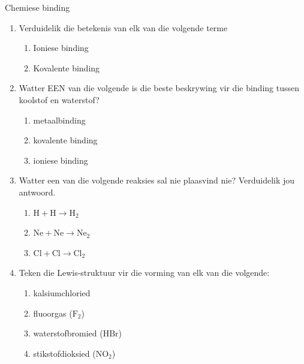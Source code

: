            \begin{eocexercises}{Chemiese binding}
            \nopagebreak
      \label{m38689*id147820}\begin{enumerate}[noitemsep, label=\textbf{\arabic*}. ] 
            \label{m38689*uid158}\item Verduidelik die betekenis van elk van die volgende terme
\label{m38689*id147842}\begin{enumerate}[noitemsep, label=\textbf{\alph*}. ] 
            \label{m38689*uid159}\item Ioniese binding
\label{m38689*uid160}\item Kovalente binding
\end{enumerate}
                \label{m38689*uid162}\item Watter EEN van die volgende is die beste beskrywing vir die binding tussen koolstof en waterstof?
\label{m38689*id147923}\begin{enumerate}[noitemsep, label=\textbf{\alph*}. ] 
            \label{m38689*uid163}\item metaalbinding
\label{m38689*uid164}\item kovalente binding
\label{m38689*uid165}\item ioniese binding
\end{enumerate}
                \label{m38689*uid171}\item Watter een van die volgende reaksies sal nie plaasvind nie? Verduidelik jou antwoord.
\label{m38689*id148047}\begin{enumerate}[noitemsep, label=\textbf{\alph*}. ] 
            \label{m38689*uid172}\item $\mathrm{H}+\mathrm{H}\to {\mathrm{H}}_{2}$\label{m38689*uid173}\item $\mathrm{Ne}+\mathrm{Ne}\to {\mathrm{Ne}}_{2}$\label{m38689*uid174}\item $\mathrm{Cl}+\mathrm{Cl}\to {\mathrm{Cl}}_{2}$\end{enumerate}
                \label{m38689*uid175}\item Teken die Lewis-struktuur vir die vorming van elk van die volgende:
\label{m38689*id148172}\begin{enumerate}[noitemsep, label=\textbf{\alph*}. ] 
            \label{m38689*uid176}\item kalsiumchloried
\label{m38689*uid177}\item fluoorgas ($\text{F}_2$)
\label{m38689*uid178}\item waterstofbromied ($\text{HBr}$)
\label{m38689*uid179}\item stikstofdioksied ($\text{NO}{}_{2}$)

\end{enumerate}
\end{enumerate}
\end{eocexercises}

